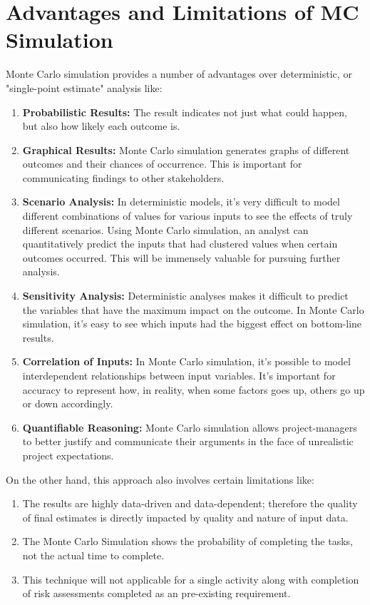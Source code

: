 \section{Advantages and Limitations of MC Simulation}
Monte Carlo simulation provides a number of advantages over deterministic, or "single-point estimate" analysis like:
\begin{enumerate}
	\item \textbf{Probabilistic Results:} The result indicates not just what could happen, but also how likely each outcome is.
	 \item \textbf{Graphical Results:} Monte Carlo simulation generates graphs of different outcomes and their chances of occurrence. This is important for communicating findings to other stakeholders.
	 \item \textbf{Scenario Analysis:} In deterministic models, it’s very difficult to model different combinations of values for various inputs to see the effects of truly different scenarios. Using Monte Carlo simulation, an analyst can quantitatively predict the inputs that had clustered values when certain outcomes occurred. This will be immensely valuable for pursuing further analysis.
     \item \textbf{Sensitivity Analysis:} Deterministic analyses makes it difficult to predict the variables that have the maximum impact on the outcome. In Monte Carlo simulation, it’s easy to see which inputs had the biggest effect on bottom-line results.
	 \item \textbf{Correlation of Inputs:} In Monte Carlo simulation, it's possible to model interdependent relationships between input variables. It’s important for accuracy to represent how, in reality, when some factors goes up, others go up or down accordingly.
	 \item \textbf{Quantifiable Reasoning:} Monte Carlo simulation allows project-managers to better justify and communicate their arguments in the face of unrealistic project expectations.
\end{enumerate}

 

On the other hand, this approach also involves certain limitations like:
\begin{enumerate}
	\item The results are highly data-driven and data-dependent; therefore the quality of final estimates is directly impacted by quality and nature of input data.
	\item The Monte Carlo Simulation shows the probability of completing the tasks, not the actual time to complete.
	\item  This technique will not applicable for a single activity along with completion of risk assessments completed as an pre-existing requirement.

\end{enumerate} 



















